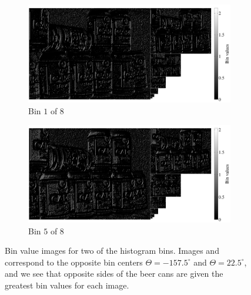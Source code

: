 \documentclass[thesis.tex]{subfiles}
\begin{document}
\begin{figure}[p]
	\centering
	\begin{subfigure}[t]{\textwidth}
		\includegraphics[width=\textwidth]{img/cellHistScaleSpacesBin01.pdf}
    	\caption{Bin $1$ of $8$}
    	\label{fig:cellHistScaleSpacesBin01}
	\end{subfigure}
	\begin{subfigure}[t]{\textwidth}
		\includegraphics[width=\textwidth]{img/cellHistScaleSpacesBin05.pdf}
    	\caption{Bin $5$ of $8$}
    	\label{fig:cellHistScaleSpacesBin05}
	\end{subfigure}
	\caption{Bin value images for two of the histogram bins. Images  and  correspond to the opposite bin centers $\Theta = -157.5^\circ$ and $\Theta = 22.5^\circ$, and we see that opposite sides of the beer cans are given the greatest bin values for each image.}
	\label{fig:cellHistScaleSpacesBins}
\end{figure}
\end{document}
